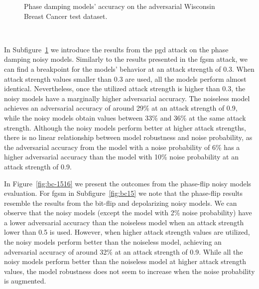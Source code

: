 \begin{figure}[!h]
\begin{subfigure}{0.45\textwidth}
      \label{fig:bc14}
  \end{subfigure}
  \caption{Phase damping models' accuracy on the adversarial Wisconsin Breast Cancer test dataset.}
  \label{fig:bc-1314}
\end{figure} \

In Subfigure~\ref{fig:bc14} we introduce the results from the \ac{pgd}
attack on the phase damping noisy models. Similarly to the results
presented in the \ac{fgsm} attack, we can find a breakpoint for the
models' behavior at an attack strength of 0.3. When attack strength
values smaller than 0.3 are used, all the models perform almost
identical. Nevertheless, once the utilized attack strength is higher
than 0.3, the noisy models have a marginally higher adversarial
accuracy. The noiseless model achieves an adversarial accuracy of
around 29\% at an attack strength of 0.9, while the noisy models
obtain values between  33\% and 36\% at the same attack strength.
Although the noisy models perform better at higher attack
strengths, there is no linear relationship between model robustness
and noise probability, as the adversarial accuracy from the
model with a noise probability of 6\% has a higher adversarial
accuracy than the model with 10\% noise probability at an
attack strength of 0.9. \

In Figure~\ref{fig:bc-1516} we present the outcomes from the phase-flip
noisy models evaluation. For \ac{fgsm} in Subfigure~\ref{fig:bc15}
we note that the phase-flip results resemble the results from
the bit-flip and depolarizing noisy models. We can observe that
the noisy models (except the model with 2\% noise probability)
have a lower adversarial accuracy than the noiseless model when
an attack strength lower than 0.5 is used. However, when higher
attack strength values are utilized, the noisy models perform better
than the noiseless model, achieving an adversarial accuracy of
around 32\% at an attack strength of 0.9. While all the noisy models
perform better than the noiseless model at higher attack strength
values, the model robustness does not seem to increase when the
noise probability is augmented. \

